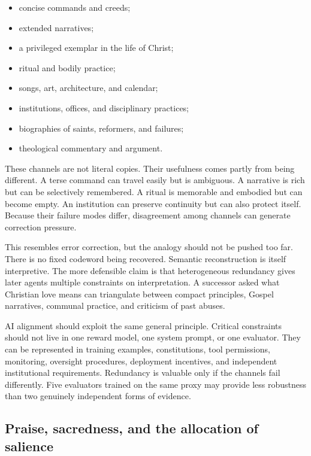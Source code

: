 \documentclass[11pt]{article}
\begin{document}
\begin{itemize}
    \item concise commands and creeds;
    \item extended narratives;
    \item a privileged exemplar in the life of Christ;
    \item ritual and bodily practice;
    \item songs, art, architecture, and calendar;
    \item institutions, offices, and disciplinary practices;
    \item biographies of saints, reformers, and failures;
    \item theological commentary and argument.
\end{itemize}

These channels are not literal copies. Their usefulness comes partly from being different. A terse command can travel easily but is ambiguous. A narrative is rich but can be selectively remembered. A ritual is memorable and embodied but can become empty. An institution can preserve continuity but can also protect itself. Because their failure modes differ, disagreement among channels can generate correction pressure.

This resembles error correction, but the analogy should not be pushed too far. There is no fixed codeword being recovered. Semantic reconstruction is itself interpretive. The more defensible claim is that heterogeneous redundancy gives later agents multiple constraints on interpretation. A successor asked what Christian love means can triangulate between compact principles, Gospel narratives, communal practice, and criticism of past abuses.

AI alignment should exploit the same general principle. Critical constraints should not live in one reward model, one system prompt, or one evaluator. They can be represented in training examples, constitutions, tool permissions, monitoring, oversight procedures, deployment incentives, and independent institutional requirements. Redundancy is valuable only if the channels fail differently. Five evaluators trained on the same proxy may provide less robustness than two genuinely independent forms of evidence.

\subsection{Praise, sacredness, and the allocation of salience}
\end{document}
